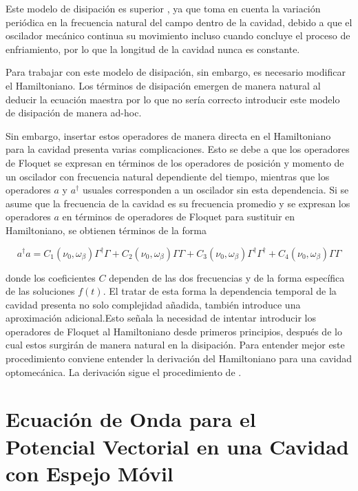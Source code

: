 \documentclass[10pt,a4paper]{report}
\begin{document}
Este modelo de disipación es superior \cite{HanngiFM}, ya que toma en cuenta la variación periódica en la frecuencia natural del campo dentro de la cavidad, debido a que el oscilador mecánico continua su movimiento incluso cuando concluye el proceso de enfriamiento, por lo que la longitud de la cavidad nunca es constante.

Para trabajar con este modelo de disipación, sin embargo, es necesario modificar el Hamiltoniano. Los términos de disipación emergen de manera natural al deducir la ecuación maestra por lo que no sería correcto introducir este modelo de disipación de manera ad-hoc.

Sin embargo, insertar estos operadores  de manera directa en el
Hamiltoniano para la cavidad presenta varias complicaciones. Esto se debe a que los operadores de Floquet se expresan en términos de los operadores de posición y momento de un oscilador con frecuencia natural dependiente del tiempo, mientras que los operadores $a$ y $a^\dagger$ usuales corresponden a un oscilador sin esta dependencia. Si se asume que la frecuencia de la cavidad es su
frecuencia promedio y se expresan los operadores $a$ en términos de operadores de Floquet para sustituir en Hamiltoniano, se obtienen términos de la forma

\begin{equation}
a^\dagger a = C_1 (\nu_0, \omega_\beta)\Gamma^\dagger \Gamma + C_2(\nu_0, \omega_\beta) \Gamma \Gamma + C_3(\nu_0, \omega_\beta) \Gamma^\dagger \Gamma^\dagger +C_4(\nu_0, \omega_\beta) \Gamma \Gamma
\end{equation}

donde los coeficientes $C$ dependen de las dos frecuencias y de la
forma específica de las soluciones $f(t)$. El tratar de esta forma la
dependencia temporal de la cavidad presenta no solo complejidad añadida, también introduce una aproximación adicional.Esto señala la necesidad de intentar introducir los operadores de Floquet al Hamiltoniano desde primeros principios, después de lo cual
estos surgirán de manera natural en la disipación. Para entender mejor este procedimiento conviene entender la derivación del Hamiltoniano para una cavidad optomecánica. La derivación sigue el procedimiento de \cite{LawOH}.

\section{Ecuación de Onda para el Potencial Vectorial en una Cavidad con Espejo Móvil}
\end{document}
